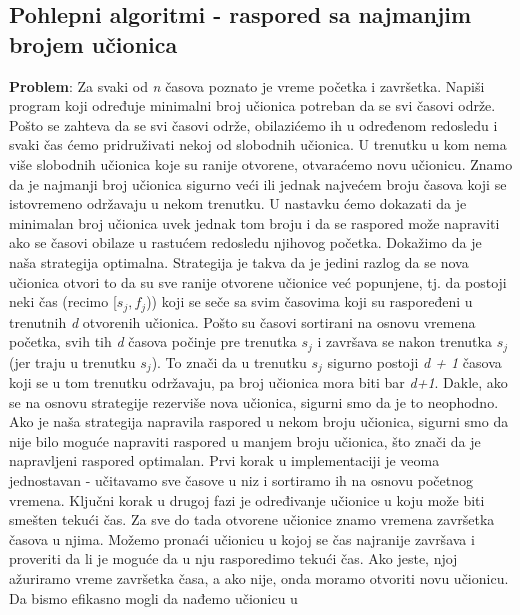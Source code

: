 \documentclass{article}
\begin{document}
\subsection{Pohlepni algoritmi - raspored sa najmanjim brojem učionica}
\textbf{Problem}: Za svaki od \textit{n} časova poznato je vreme početka i završetka. Napiši
program koji određuje minimalni broj učionica potreban da se svi časovi održe.
\newline
Pošto se zahteva da se svi časovi održe, obilazićemo ih u određenom
redosledu i svaki čas ćemo pridruživati nekoj od slobodnih učionica. U trenutku
u kom nema više slobodnih učionica koje su ranije otvorene, otvaraćemo novu
učionicu.
\newline
Znamo da je najmanji broj učionica sigurno veći ili jednak najvećem broju časova
koji se istovremeno održavaju u nekom trenutku. U nastavku ćemo dokazati da je
minimalan broj učionica uvek jednak tom broju i da se raspored može napraviti
ako se časovi obilaze u rastućem redosledu njihovog početka.
\newline
Dokažimo da je naša strategija optimalna. Strategija je takva da je jedini razlog
da se nova učionica otvori to da su sve ranije otvorene učionice već popunjene,
tj. da postoji neki čas (recimo [$s_j, f_j$)) koji se seče sa svim časovima koji su
raspoređeni u trenutnih \textit{d} otvorenih učionica. Pošto su časovi sortirani na
osnovu vremena početka, svih tih \textit{d} časova počinje pre trenutka $s_j$ i završava se
nakon trenutka $s_j$ (jer traju u trenutku $s_j$). To znači da u trenutku $s_j$ sigurno
postoji \textit{d + 1} časova koji se u tom trenutku
održavaju, pa broj učionica mora biti bar \textit{d+1}.
\newline
Dakle, ako se na osnovu strategije
rezerviše nova učionica, sigurni smo da je to neophodno. Ako je naša strategija
napravila raspored u nekom broju učionica, sigurni smo da nije bilo moguće
napraviti raspored u manjem broju učionica, što znači da je napravljeni raspored
optimalan.
\newline
Prvi korak u implementaciji je veoma jednostavan - učitavamo sve časove u
niz i sortiramo ih na osnovu početnog vremena. Ključni korak u drugoj fazi je
određivanje učionice u koju može biti smešten tekući čas. Za sve do tada otvorene
učionice znamo vremena završetka časova u njima. Možemo pronaći učionicu u
kojoj se čas najranije završava i proveriti da li je moguće da u nju rasporedimo
tekući čas. Ako jeste, njoj ažuriramo vreme završetka časa, a ako nije, onda
moramo otvoriti novu učionicu. Da bismo efikasno mogli da nađemo učionicu u
\end{document}
